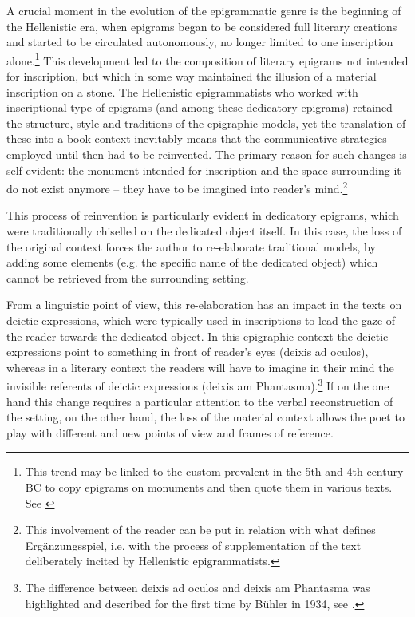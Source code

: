 \documentclass[amsthm,ebook]{saparticle}
\begin{document}
A crucial moment in the evolution of the epigrammatic genre is the beginning of the Hellenistic era, when epigrams
began to be considered full literary creations and started to be circulated autonomously, no longer limited to one
inscription alone.\footnote{ This trend may be linked to the custom prevalent in the 5th and 4th century BC to copy
epigrams on monuments and then quote them in various texts. See \citep[47ff.]{gutzwiller_poetic_1998}} This development led to the
composition of literary epigrams not intended for inscription, but which in some way maintained the illusion of a
material inscription on a stone. The Hellenistic epigrammatists who worked with inscriptional type of epigrams (and
among these dedicatory epigrams) retained the structure, style and traditions of the epigraphic models, yet the
translation of these into a book context inevitably means that the communicative strategies employed until then had to
be reinvented. The primary reason for such changes is self-evident: the monument intended for inscription and the space
surrounding it do not exist anymore – they have to be imagined into reader's mind.\footnote{ This involvement of the
reader can be put in relation with what \citep{Bing1995} defines Ergänzungsspiel, i.e. with the process of supplementation
of the text deliberately incited by Hellenistic epigrammatists.}

This process of reinvention is particularly evident in dedicatory epigrams, which were traditionally chiselled on the
dedicated object itself. In this case, the loss of the original context forces the author to re-elaborate traditional
models, by adding some elements (e.g. the specific name of the dedicated object) which cannot be retrieved from the
surrounding setting. 

From a linguistic point of view, this re-elaboration has an impact in the texts on deictic expressions, which were
typically used in inscriptions to lead the gaze of the reader towards the dedicated object. In this epigraphic context
the deictic expressions point to something in front of reader's eyes (deixis ad oculos), whereas in a literary context
the readers will have to imagine in their mind the invisible referents of deictic expressions (deixis am
Phantasma).\footnote{ The difference between deixis ad oculos and deixis am Phantasma was highlighted and described for
the first time by Bühler in 1934, see \citet[121-126, 133-135]{buhler_sprachtheorie:_1982}.} If on the one hand this change requires a
particular attention to the verbal reconstruction of the setting, on the other hand, the loss of the material context
allows the poet to play with different and new points of view and frames of reference. 
\end{document}
